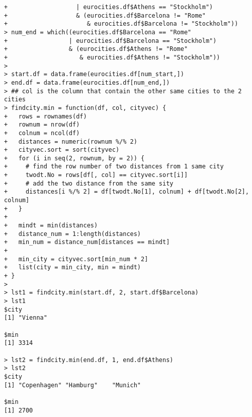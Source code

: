 \documentclass[11pt]{report}
\theoremstyle{definition}
\theoremstyle{remark}
\begin{document}
\begin{enumerate}
\begin{enumerate}
\begin{verbatim}
+                   | eurocities.df$Athens == "Stockholm")
+                   & (eurocities.df$Barcelona != "Rome"
+                      & eurocities.df$Barcelona != "Stockholm"))
> num_end = which((eurocities.df$Barcelona == "Rome"
+                 | eurocities.df$Barcelona == "Stockholm")
+                 & (eurocities.df$Athens != "Rome"
+                    & eurocities.df$Athens != "Stockholm"))
>
> start.df = data.frame(eurocities.df[num_start,])
> end.df = data.frame(eurocities.df[num_end,])
> ## col is the column that contain the other same cities to the 2 cities
> findcity.min = function(df, col, cityvec) {
+   rows = rownames(df)
+   rownum = nrow(df)
+   colnum = ncol(df)
+   distances = numeric(rownum %/% 2)
+   cityvec.sort = sort(cityvec)
+   for (i in seq(2, rownum, by = 2)) {
+     # find the row number of two distances from 1 same city
+     twodt.No = rows[df[, col] == cityvec.sort[i]]
+     # add the two distance from the same sity
+     distances[i %/% 2] = df[twodt.No[1], colnum] + df[twodt.No[2], colnum]
+   }
+   
+   mindt = min(distances)
+   distance_num = 1:length(distances)
+   min_num = distance_num[distances == mindt]
+ 
+   min_city = cityvec.sort[min_num * 2]
+   list(city = min_city, min = mindt)
+ }
> 
> lst1 = findcity.min(start.df, 2, start.df$Barcelona)
> lst1
$city
[1] "Vienna"

$min
[1] 3314

> lst2 = findcity.min(end.df, 1, end.df$Athens)
> lst2
$city
[1] "Copenhagen" "Hamburg"    "Munich"    

$min
[1] 2700


\end{verbatim}
\end{enumerate}
\end{enumerate}
\end{document}
